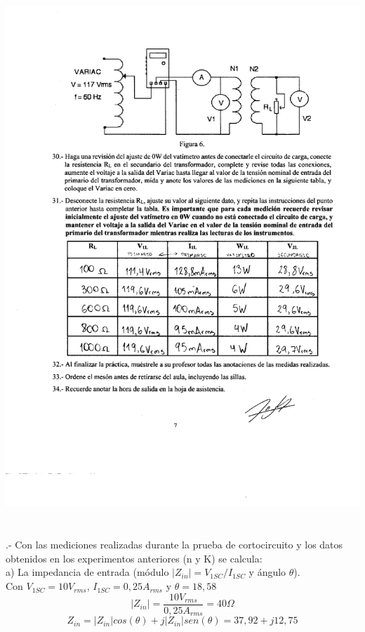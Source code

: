 \documentclass[12pt]{article}
\begin{document}
	\includegraphics[width=16cm,height=21cm]{Img/lab_8_0006}\\
	
	\vspace{1cm}
	.- Con las mediciones realizadas durante la prueba de cortocircuito y los datos obtenidos en los experimentos anteriores (n y K) se calcula:\\
	
	a) La impedancia de entrada (módulo $|Z_{in}|= V_{1SC} / I_{1SC}$ y ángulo $\theta$).\\
	
	Con $V_{1SC} = 10 V_{rms}$, $I_{1SC} = 0,25 A_{rms}$ y $\theta = 18,58$ $$|Z_{in}| = \frac{10V_{rms}}{0,25A_{rms}} = 40 \Omega$$ $$Z_{in} = |Z_{in}|cos(\theta) + j|Z_{in}|sen(\theta) = 37,92 + j12,75$$
	
\end{document}
